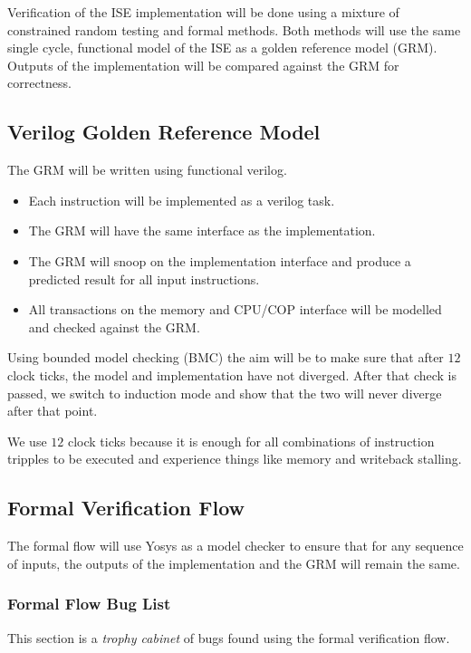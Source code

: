 
Verification of the ISE implementation will be done using a mixture of
constrained random testing and formal methods.
Both methods will use the same single cycle, functional model of the ISE as a
golden reference model (GRM).
Outputs of the implementation will be compared against the GRM for
correctness.

\subsection{Verilog Golden Reference Model}

The GRM will be written using functional verilog.

\begin{itemize}
\item Each instruction will be implemented as a verilog task.
\item The GRM will have the same interface as the implementation.
\item The GRM will snoop on the implementation interface and produce a
    predicted result for all input instructions.
\item All transactions on the memory and CPU/COP interface will be modelled
    and checked against the GRM.
\end{itemize}

Using bounded model checking (BMC) the aim will be to make sure that after
$12$ clock ticks, the model and implementation have not diverged.
After that check is passed, we switch to induction mode and show that the two
will never diverge after that point.

We use $12$ clock ticks because it is enough for all combinations of 
instruction tripples to be executed and experience things like memory
and writeback stalling.

\subsection{Formal Verification Flow}

The formal flow will use Yosys as a model checker to ensure that for any
sequence of inputs, the outputs of the implementation and the GRM will remain
the same.

\subsubsection{Formal Flow Bug List}

This section is a {\em trophy cabinet} of bugs found using the formal
verification flow.

